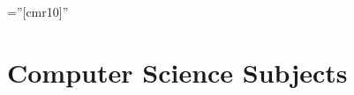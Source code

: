 \documentclass[a4paper,10pt]{article} %
\begin{document}
\pagestyle{empty} %

\font\fb=''[cmr10]'' %


\par{\bigskip\par} %

\section{Computer Science Subjects}
\end{document}
